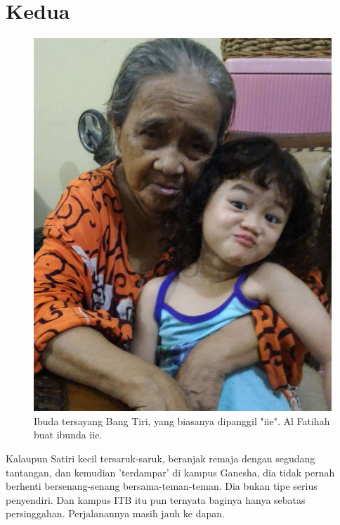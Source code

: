 
\chapter{Kedua}

\begin{figure}[htbp]
\centerline{\includegraphics[scale=1.1]{01-02-01}}
\caption{Ibuda tersayang Bang Tiri, yang biasanya dipanggil "iie". Al Fatihah buat ibunda iie.}
\label{01-02-01}
\end{figure}
%

Kalaupun Satiri kecil tersaruk-saruk, beranjak remaja dengan segudang tantangan, dan kemudian 'terdampar' di kampus Ganesha, dia tidak pernah berhenti bersenang-senang bersama-teman-teman. Dia bukan tipe serius penyendiri. Dan kampus ITB itu pun ternyata baginya hanya sebatas persinggahan. Perjalanannya masih jauh ke dapan.


